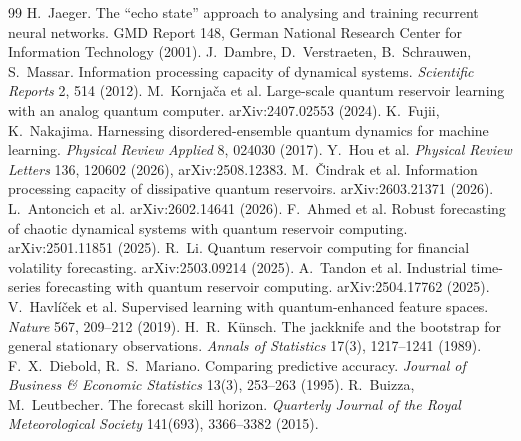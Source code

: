 \documentclass[11pt]{article}
\begin{document}

\begin{thebibliography}{99}
 H.~Jaeger. The ``echo state'' approach to analysing and training recurrent
neural networks. GMD Report 148, German National Research Center for Information Technology
(2001).
 J.~Dambre, D.~Verstraeten, B.~Schrauwen, S.~Massar. Information processing
capacity of dynamical systems. \emph{Scientific Reports} 2, 514 (2012).
 M.~Kornja\v{c}a et al. Large-scale quantum reservoir learning with an
analog quantum computer. arXiv:2407.02553 (2024).
 K.~Fujii, K.~Nakajima. Harnessing disordered-ensemble quantum dynamics for
machine learning. \emph{Physical Review Applied} 8, 024030 (2017).
 Y.~Hou et al. \emph{Physical Review Letters} 136, 120602 (2026), arXiv:2508.12383.
 M.~\v{C}indrak et al. Information processing capacity of dissipative
quantum reservoirs. arXiv:2603.21371 (2026).
 L.~Antoncich et al. arXiv:2602.14641 (2026).
 F.~Ahmed et al. Robust forecasting of chaotic dynamical systems with quantum
reservoir computing. arXiv:2501.11851 (2025).
 R.~Li. Quantum reservoir computing for financial volatility forecasting.
arXiv:2503.09214 (2025).
 A.~Tandon et al. Industrial time-series forecasting with quantum reservoir
computing. arXiv:2504.17762 (2025).
 V.~Havl\'{i}\v{c}ek et al. Supervised learning with quantum-enhanced
feature spaces. \emph{Nature} 567, 209--212 (2019).
 H.~R.~K\"unsch. The jackknife and the bootstrap for general stationary
observations. \emph{Annals of Statistics} 17(3), 1217--1241 (1989).
 F.~X.~Diebold, R.~S.~Mariano. Comparing predictive accuracy.
\emph{Journal of Business \& Economic Statistics} 13(3), 253--263 (1995).
 R.~Buizza, M.~Leutbecher. The forecast skill horizon. \emph{Quarterly
Journal of the Royal Meteorological Society} 141(693), 3366--3382 (2015).
\end{thebibliography}
\end{document}

